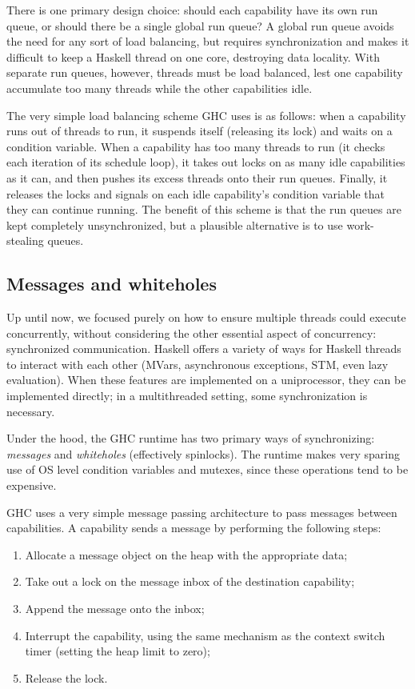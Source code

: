 There is one primary design choice: should each capability have its own
run queue, or should there be a single global run queue?  A global run
queue avoids the need for any sort of load balancing, but requires
synchronization and makes it difficult to keep a Haskell thread on one
core, destroying data locality.  With separate run queues, however,
threads must be load balanced, lest one capability accumulate too many
threads while the other capabilities idle.

The very simple load balancing scheme GHC uses is as follows: when a capability
runs out of threads to run, it suspends itself (releasing its lock) and
waits on a condition variable.  When a capability has too many threads
to run (it checks each iteration of its schedule loop), it takes out
locks on as many idle capabilities as it can, and then pushes its excess
threads onto their run queues.  Finally, it releases the locks and
signals on each idle capability's condition variable that they can
continue running.  The benefit of this scheme is that the run queues are
kept completely unsynchronized, but a plausible alternative is to use
work-stealing queues.

\subsection{Messages and whiteholes}

Up until now, we focused purely on how to ensure multiple threads could
execute concurrently, without considering the other essential aspect of
concurrency: synchronized communication.  Haskell offers a variety of
ways for Haskell threads to interact with each other (MVars,
asynchronous exceptions, STM, even lazy evaluation).  When these features
are implemented on a uniprocessor, they can be implemented directly;
in a multithreaded setting, some synchronization is necessary.

Under the hood, the GHC runtime has two primary ways of synchronizing:
\emph{messages} and \emph{whiteholes} (effectively spinlocks).  The
runtime makes very sparing use of OS level condition variables and
mutexes, since these operations tend to be expensive.

GHC uses a very simple message passing architecture to pass messages
between capabilities.  A capability sends a message by performing the following steps:

\begin{enumerate}
    \item Allocate a message object on the heap with the appropriate data;
    \item Take out a lock on the message inbox of the destination capability;
    \item Append the message onto the inbox;
    \item Interrupt the capability, using the same mechanism as the context switch timer (setting the heap limit to zero);
    \item Release the lock.
\end{enumerate}

